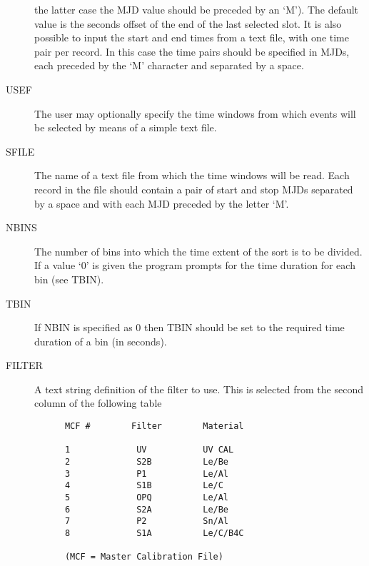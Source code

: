 \begin{description}
the latter case the MJD value should be preceded by an `M'). The default 
value is the seconds offset of the end of the last selected slot. It is also possible
to input the start and end times from a text file, with one time pair per
record. In this case the time pairs should be specified in MJDs, each 
preceded by the `M' character and separated by a space.
\item[USEF]
The user may optionally specify the time windows from which events
will be selected by means of a simple text file.
\item[SFILE]
The name of a text file from which the time windows will be read.
Each record in the file should contain a pair of start and stop MJDs
separated by a space and with each MJD preceded by the letter `M'.
\item[NBINS]
The number of bins into which the time extent of the sort 
is to be divided. If a value `0' is given the program prompts for the
time duration for each bin (see TBIN).
\item[TBIN]
If NBIN is specified as 0 then TBIN should be set to the required
time duration of a bin (in seconds).
\item[FILTER]
A text string definition of the filter to use. This is selected from
the second column of the following table

\begin{verbatim}
      MCF #        Filter        Material

      1             UV           UV CAL
      2             S2B          Le/Be
      3             P1           Le/Al
      4             S1B          Le/C
      5             OPQ          Le/Al
      6             S2A          Le/Be
      7             P2           Sn/Al
      8             S1A          Le/C/B4C
 
      (MCF = Master Calibration File)
\end{verbatim}


\end{description}
